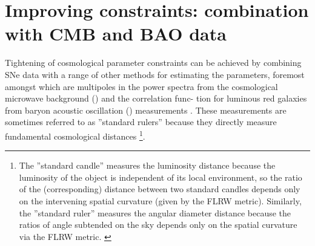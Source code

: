 \section{Improving constraints: combination with CMB and BAO data}
\label{sec:5.3}

\begin{figure}
\centering
\end{figure}

\begin{figure}
\centering
\end{figure}


Tightening of cosmological parameter constraints can be achieved by combining SNe data with a range of other methods for estimating the parameters, foremost amongst which are multipoles in the power spectra from the cosmological microwave background (\cmb{}) \cite{LewisBridle2002,Spergel2007,Komatsu2010,Dunkley2009} and the correlation func- tion for luminous red galaxies from baryon acoustic oscillation (\bao{}) measurements \cite{Eisenstein2005,Carroll2001,Percival2007}. These measurements are sometimes referred to as ”standard rulers” because they directly measure fundamental cosmological distances \footnote{The ”standard candle” measures the luminosity distance because the luminosity of the object is independent of its local environment, so the ratio of the (corresponding) distance between two standard candles depends only on the intervening spatial curvature (given by the FLRW metric). Similarly, the ”standard ruler” measures the angular diameter distance because the ratios of angle subtended on the sky depends only on the spatial curvature via the FLRW metric. \cite{Hobson2006}}. 

